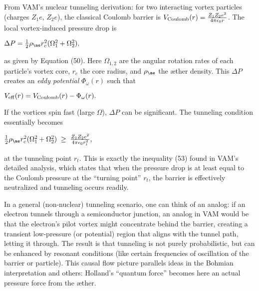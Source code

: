 \documentclass[a4paper, aps,preprint,superscriptaddress, 12pt]{revtex4}
\begin{document}
From VAM’s nuclear tunneling derivation: for two interacting vortex particles (charges $Z_1e$, $Z_2e$), the classical Coulomb barrier is $V_{\rm Coulomb}(r) = \frac{Z_1 Z_2 e^2}{4\pi\epsilon_0 r}$. The local vortex-induced pressure drop is

$\Delta P = \frac{1}{2}\rho_{\ae} r_c^2 (\Omega_1^2 + \Omega_2^2),$

as given by Equation (50). Here $\Omega_{1,2}$ are the angular rotation rates of each particle’s vortex core, $r_c$ the core radius, and $\rho_{\ae}$ the æther density. This $\Delta P$ creates an \textit{eddy potential} $\Phi_\omega(r)$ such that

$V_{\rm eff}(r) = V_{\rm Coulomb}(r) - \Phi_\omega(r).$

If the vortices spin fast (large $\Omega$), $\Delta P$ can be significant. The tunneling condition essentially becomes

$\frac{1}{2}\rho_{\ae} r_c^2 (\Omega_1^2 + \Omega_2^2) \;\ge\; \frac{Z_1 Z_2 e^2}{4\pi\epsilon_0 r_t^2},$

at the tunneling point $r_t$. This is exactly the inequality (53) found in VAM’s detailed analysis, which states that when the pressure drop is at least equal to the Coulomb pressure at the “turning point” $r_t$, the barrier is effectively neutralized and tunneling occurs readily.


In a general (non-nuclear) tunneling scenario, one can think of an analog: if an electron tunnels through a semiconductor junction, an analog in VAM would be that the electron’s pilot vortex might concentrate behind the barrier, creating a transient low-pressure (or potential) region that aligns with the tunnel path, letting it through. The result is that tunneling is not purely probabilistic, but can be enhanced by resonant conditions (like certain frequencies of oscillation of the barrier or particle). This causal flow picture parallels ideas in the Bohmian interpretation and others: Holland’s “quantum force” becomes here an actual pressure force from the æther.
\end{document}
